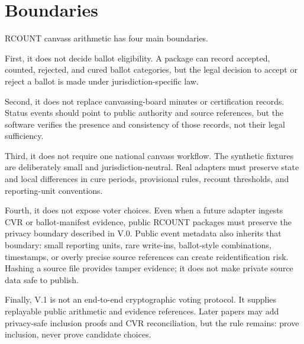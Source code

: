 \section{Boundaries}

RCOUNT canvass arithmetic has four main boundaries.

First, it does not decide ballot eligibility. A package can record accepted,
counted, rejected, and cured ballot categories, but the legal decision to accept
or reject a ballot is made under jurisdiction-specific law.

Second, it does not replace canvassing-board minutes or certification records.
Status events should point to public authority and source references, but the
software verifies the presence and consistency of those records, not their legal
sufficiency.

Third, it does not require one national canvass workflow. The synthetic fixtures
are deliberately small and jurisdiction-neutral. Real adapters must preserve
state and local differences in cure periods, provisional rules, recount
thresholds, and reporting-unit conventions.

Fourth, it does not expose voter choices. Even when a future adapter ingests CVR
or ballot-manifest evidence, public RCOUNT packages must preserve the privacy
boundary described in V.0. Public event metadata also inherits that boundary:
small reporting units, rare write-ins, ballot-style combinations, timestamps,
or overly precise source references can create reidentification risk. Hashing a
source file provides tamper evidence; it does not make private source data safe
to publish.

Finally, V.1 is not an end-to-end cryptographic voting protocol. It supplies
replayable public arithmetic and evidence references. Later papers may add
privacy-safe inclusion proofs and CVR reconciliation, but the rule remains:
prove inclusion, never prove candidate choices.

